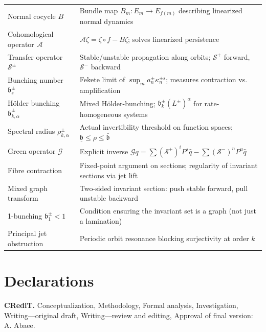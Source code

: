 \documentclass[11pt,a4paper]{article}
\theoremstyle{plain}
\theoremstyle{definition}
\theoremstyle{remark}
\numberwithin{equation}{section}
\numberwithin{figure}{section}
\begin{document}
\begin{tabularx}{\textwidth}{l X}
Normal cocycle $B$ & Bundle map $B_m:E_m\to E_{f(m)}$ describing linearized normal dynamics \\
Cohomological operator $\mathcal A$ & $\mathcal A\zeta = \zeta\circ f - B\zeta$; solves linearized persistence \\
Transfer operator $\mathcal S^\pm$ & Stable/unstable propagation along orbits; $\mathcal S^+$ forward, $\mathcal S^-$ backward \\
Bunching number $\mathfrak b^\pm_s$ & Fekete limit of $\sup_m a_n^\pm \kappa_n^{\pm s}$; measures contraction vs. amplification \\
Hölder bunching $\bar{\mathfrak b}^\pm_{k,\alpha}$ & Mixed Hölder-bunching; $\mathfrak b^\pm_k(L^\pm)^\alpha$ for rate-homogeneous systems \\
Spectral radius $\rho^\pm_{k,\alpha}$ & Actual invertibility threshold on function spaces; $\underline{\mathfrak b}\le\rho\le\bar{\mathfrak b}$ \\
Green operator $\mathcal G$ & Explicit inverse $\mathcal Gq=\sum(\mathcal S^+)^iP^s\hat q-\sum(\mathcal S^-)^nP^u\hat q$ \\
Fibre contraction & Fixed-point argument on sections; regularity of invariant sections via jet lift \\
Mixed graph transform & Two-sided invariant section: push stable forward, pull unstable backward \\
1-bunching $\mathfrak b_1^\pm<1$ & Condition ensuring the invariant set is a graph (not just a lamination) \\
Principal jet obstruction & Periodic orbit resonance blocking surjectivity at order $k$ \\
\end{tabularx}

\section*{Declarations}

\noindent \textbf{CRediT.} Conceptualization, Methodology, Formal analysis, Investigation, Writing—original draft, Writing—review and editing, Approval of final version: A. Abaee.

\vspace{0.5em}
\end{document}
